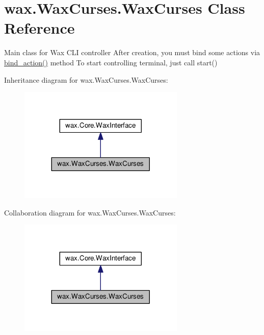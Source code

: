 \hypertarget{classwax_1_1WaxCurses_1_1WaxCurses}{}\section{wax.\+Wax\+Curses.\+Wax\+Curses Class Reference}
\label{classwax_1_1WaxCurses_1_1WaxCurses}


Main class for Wax C\+LI controller After creation, you must bind some actions via \hyperlink{classwax_1_1Core_1_1WaxInterface_af10d87f79dc119f4d5f30cd70ef9feb9}{bind\+\_\+action()} method To start controlling terminal, just call start()  




Inheritance diagram for wax.\+Wax\+Curses.\+Wax\+Curses\+:
\nopagebreak
\begin{figure}[H]
\begin{center}
\leavevmode
\includegraphics[width=224pt]{classwax_1_1WaxCurses_1_1WaxCurses__inherit__graph}
\end{center}
\end{figure}


Collaboration diagram for wax.\+Wax\+Curses.\+Wax\+Curses\+:
\nopagebreak
\begin{figure}[H]
\begin{center}
\leavevmode
\includegraphics[width=224pt]{classwax_1_1WaxCurses_1_1WaxCurses__coll__graph}
\end{center}
\end{figure}
